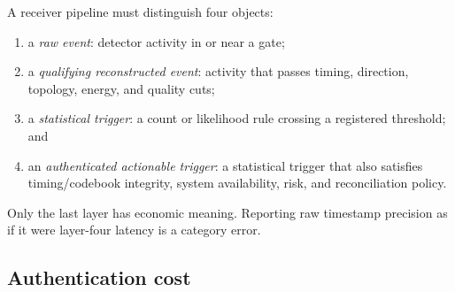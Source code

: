 \documentclass[11pt]{article}
\begin{document}
A receiver pipeline must distinguish four objects:

\begin{enumerate}[leftmargin=*]
  \item a \emph{raw event}: detector activity in or near a gate;
  \item a \emph{qualifying reconstructed event}: activity that passes timing, direction, topology, energy, and quality cuts;
  \item a \emph{statistical trigger}: a count or likelihood rule crossing a registered threshold; and
  \item an \emph{authenticated actionable trigger}: a statistical trigger that also satisfies timing/codebook integrity, system availability, risk, and reconciliation policy.
\end{enumerate}

Only the last layer has economic meaning. Reporting raw timestamp precision as if it were layer-four latency is a category error.

\subsection{Authentication cost}
\end{document}
